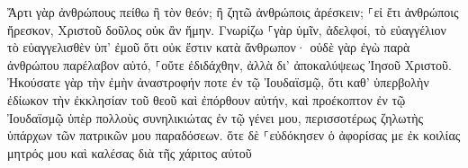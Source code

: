 \documentclass{openreader}
\begin{document}
Ἄρτι γὰρ ἀνθρώπους πείθω ἢ τὸν θεόν; ἢ ζητῶ ἀνθρώποις ἀρέσκειν; ⸀εἰ ἔτι ἀνθρώποις ἤρεσκον, Χριστοῦ δοῦλος οὐκ ἂν ἤμην. 
Γνωρίζω ⸀γὰρ ὑμῖν, ἀδελφοί, τὸ εὐαγγέλιον τὸ εὐαγγελισθὲν ὑπ’ ἐμοῦ ὅτι οὐκ ἔστιν κατὰ ἄνθρωπον· 
οὐδὲ γὰρ ἐγὼ παρὰ ἀνθρώπου παρέλαβον αὐτό, ⸀οὔτε ἐδιδάχθην, ἀλλὰ δι’ ἀποκαλύψεως Ἰησοῦ Χριστοῦ. 
Ἠκούσατε γὰρ τὴν ἐμὴν ἀναστροφήν ποτε ἐν τῷ Ἰουδαϊσμῷ, ὅτι καθ’ ὑπερβολὴν ἐδίωκον τὴν ἐκκλησίαν τοῦ θεοῦ καὶ ἐπόρθουν αὐτήν, 
καὶ προέκοπτον ἐν τῷ Ἰουδαϊσμῷ ὑπὲρ πολλοὺς συνηλικιώτας ἐν τῷ γένει μου, περισσοτέρως ζηλωτὴς ὑπάρχων τῶν πατρικῶν μου παραδόσεων. 
ὅτε δὲ ⸀εὐδόκησεν ὁ ἀφορίσας με ἐκ κοιλίας μητρός μου καὶ καλέσας διὰ τῆς χάριτος αὐτοῦ 
\end{document}

